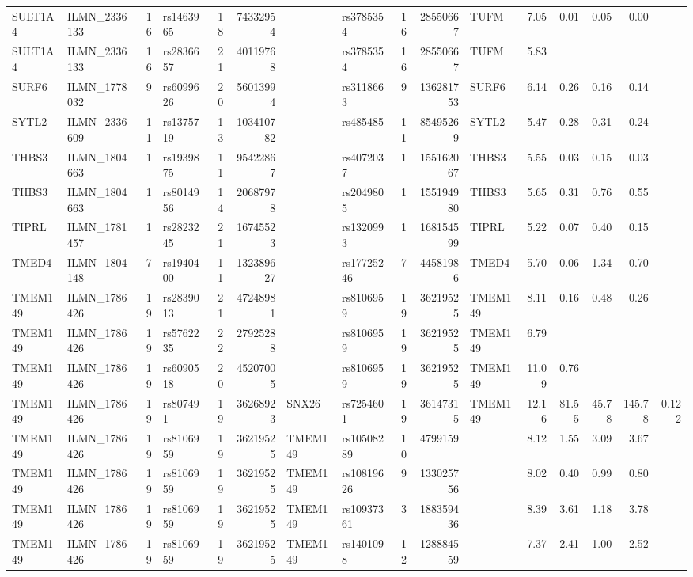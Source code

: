 \documentclass{article}
\begin{document}
\begin{landscape}
{\begin{ThreePartTable}
\begin{longtable}{|llr|lrrl|lrrl|rrrr|r|}
  SULT1A4 & ILMN\_2336133 & 16 & rs1463965 & 18 & 74332954 &  & rs3785354 & 16 & 28550667 & TUFM & 7.05 & 0.01 & 0.05 & 0.00 &  \\
  SULT1A4 & ILMN\_2336133 & 16 & rs2836657 & 21 & 40119768 &  & rs3785354 & 16 & 28550667 & TUFM & 5.83 &  &  &  &  \\
  SURF6 & ILMN\_1778032 & 9 & rs6099626 & 20 & 56013994 &  & rs3118663 & 9 & 136281753 & SURF6 & 6.14 & 0.26 & 0.16 & 0.14 &  \\
  SYTL2 & ILMN\_2336609 & 11 & rs1375719 & 13 & 103410782 &  & rs485485 & 11 & 85495269 & SYTL2 & 5.47 & 0.28 & 0.31 & 0.24 &  \\
  THBS3 & ILMN\_1804663 & 1 & rs1939875 & 11 & 95422867 &  & rs4072037 & 1 & 155162067 & THBS3 & 5.55 & 0.03 & 0.15 & 0.03 &  \\
  THBS3 & ILMN\_1804663 & 1 & rs8014956 & 14 & 20687978 &  & rs2049805 & 1 & 155194980 & THBS3 & 5.65 & 0.31 & 0.76 & 0.55 &  \\
  TIPRL & ILMN\_1781457 & 1 & rs2823245 & 21 & 16745523 &  & rs1320993 & 1 & 168154599 & TIPRL & 5.22 & 0.07 & 0.40 & 0.15 &  \\
  TMED4 & ILMN\_1804148 & 7 & rs1940400 & 11 & 132389627 &  & rs17725246 & 7 & 44581986 & TMED4 & 5.70 & 0.06 & 1.34 & 0.70 &  \\
  TMEM149 & ILMN\_1786426 & 19 & rs2839013 & 21 & 47248981 &  & rs8106959 & 19 & 36219525 & TMEM149 & 8.11 & 0.16 & 0.48 & 0.26 &  \\
  TMEM149 & ILMN\_1786426 & 19 & rs5762235 & 22 & 27925288 &  & rs8106959 & 19 & 36219525 & TMEM149 & 6.79 &  &  &  &  \\
  TMEM149 & ILMN\_1786426 & 19 & rs6090518 & 20 & 45207005 &  & rs8106959 & 19 & 36219525 & TMEM149 & 11.09 & 0.76 &  &  &  \\
  TMEM149 & ILMN\_1786426 & 19 & rs807491 & 19 & 36268923 & SNX26 & rs7254601 & 19 & 36147315 & TMEM149 & 12.16 & 81.55 & 45.78 & 145.78 & 0.122 \\
  TMEM149 & ILMN\_1786426 & 19 & rs8106959 & 19 & 36219525 & TMEM149 & rs10508289 & 10 & 4799159 &  & 8.12 & 1.55 & 3.09 & 3.67 &  \\
  TMEM149 & ILMN\_1786426 & 19 & rs8106959 & 19 & 36219525 & TMEM149 & rs10819626 & 9 & 133025756 &  & 8.02 & 0.40 & 0.99 & 0.80 &  \\
  TMEM149 & ILMN\_1786426 & 19 & rs8106959 & 19 & 36219525 & TMEM149 & rs10937361 & 3 & 188359436 &  & 8.39 & 3.61 & 1.18 & 3.78 &  \\
  TMEM149 & ILMN\_1786426 & 19 & rs8106959 & 19 & 36219525 & TMEM149 & rs1401098 & 12 & 128884559 &  & 7.37 & 2.41 & 1.00 & 2.52 &  \\

\end{longtable}
\end{ThreePartTable}}
\end{landscape}
\end{document}
